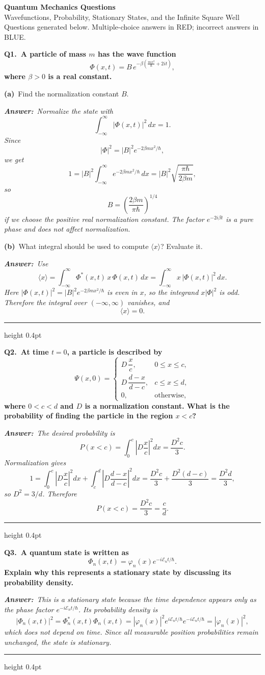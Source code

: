 \documentclass[11pt]{article}
\newcommand{\QuestionStyle}[1]{{\large\bfseries\boldmath #1}}
\newcommand{\OEBlock}[3]{%
  \Needspace{5\baselineskip}%
  \noindent
  \begin{minipage}{\linewidth}
    \QuestionStyle{#1.~#2}

    \vspace{0.25em}
    \noindent\textcolor{AnsRed}{\textit{\textbf{Answer:}~#3}}

    \vspace{0.25em}
    \hrule height 0.4pt
  \end{minipage}
  \vspace{0.75em}
}
\newcommand{\MPBlock}[3]{%
  \Needspace{8\baselineskip}%
  \noindent
  \begin{minipage}{\linewidth}
    \QuestionStyle{#1.~#2}

    \vspace{0.25em}
    #3

    \vspace{0.25em}
    \hrule height 0.4pt
  \end{minipage}
  \vspace{0.75em}
}
\newcommand{\OEPart}[3]{%
  \par\vspace{0.35em}
  \noindent\textbf{(#1)}~#2
  \par\vspace{0.15em}
  \noindent\textit{\textbf{Answer:}~#3}
  \par
}
\begin{document}
\begin{center}
{\huge \textbf{Quantum Mechanics Questions}}\\[0.25em]
{\Large Wavefunctions, Probability, Stationary States, and the Infinite Square Well}\\[0.25em]
{\large Questions generated below. Multiple-choice answers in RED; incorrect answers in BLUE.}
\end{center}

\vspace{0.75em}

\MPBlock{Q1}{A particle of mass $m$ has the wave function
\[
\Phi(x,t)=B\,e^{-\beta\left(\frac{m x^2}{\hbar}+2it\right)},
\]
where $\beta>0$ is a real constant.}{%
\OEPart{a}{Find the normalization constant $B$.}{Normalize the state with
\[
\int_{-\infty}^{\infty}|\Phi(x,t)|^2\,dx=1.
\]
Since
\[
|\Phi|^2=|B|^2 e^{-2\beta m x^2/\hbar},
\]
we get
\[
1=|B|^2\int_{-\infty}^{\infty} e^{-2\beta m x^2/\hbar}\,dx=|B|^2\sqrt{\frac{\pi\hbar}{2\beta m}},
\]
so
\[
B=\left(\frac{2\beta m}{\pi\hbar}\right)^{1/4}
\]
if we choose the positive real normalization constant. The factor $e^{-2i\beta t}$ is a pure phase and does not affect normalization.}
\OEPart{b}{What integral should be used to compute $\langle x\rangle$? Evaluate it.}{Use
\[
\langle x\rangle=\int_{-\infty}^{\infty}\Phi^*(x,t)\,x\,\Phi(x,t)\,dx=\int_{-\infty}^{\infty}x\,|\Phi(x,t)|^2\,dx.
\]
Here $|\Phi(x,t)|^2=|B|^2 e^{-2\beta m x^2/\hbar}$ is even in $x$, so the integrand $x|\Phi|^2$ is odd. Therefore the integral over $(-\infty,\infty)$ vanishes, and
\[
\langle x\rangle=0.
\]}
}

\OEBlock{Q2}{At time $t=0$, a particle is described by
\[
\Psi(x,0)=\begin{cases}
D\,\dfrac{x}{c}, & 0\le x\le c,\\[6pt]
D\,\dfrac{d-x}{d-c}, & c\le x\le d,\\[6pt]
0, & \text{otherwise,}
\end{cases}
\]
where $0<c<d$ and $D$ is a normalization constant. What is the probability of finding the particle in the region $x<c$?}{The desired probability is
\[
P(x<c)=\int_0^c\left|D\frac{x}{c}\right|^2 dx=\frac{D^2 c}{3}.
\]
Normalization gives
\[
1=\int_0^c\left|D\frac{x}{c}\right|^2dx+\int_c^d\left|D\frac{d-x}{d-c}\right|^2dx=\frac{D^2 c}{3}+\frac{D^2(d-c)}{3}=\frac{D^2 d}{3},
\]
so $D^2=3/d$. Therefore
\[
P(x<c)=\frac{D^2 c}{3}=\frac{c}{d}.
\]}

\OEBlock{Q3}{A quantum state is written as
\[
\Phi_n(x,t)=\varphi_n(x)e^{-i\mathcal{E}_n t/\hbar}.
\]
Explain why this represents a stationary state by discussing its probability density.}{This is a stationary state because the time dependence appears only as the phase factor $e^{-i\mathcal{E}_n t/\hbar}$. Its probability density is
\[
|\Phi_n(x,t)|^2=\Phi_n^*(x,t)\Phi_n(x,t)=|\varphi_n(x)|^2 e^{i\mathcal{E}_n t/\hbar}e^{-i\mathcal{E}_n t/\hbar}=|\varphi_n(x)|^2,
\]
which does not depend on time. Since all measurable position probabilities remain unchanged, the state is stationary.}
\end{document}
